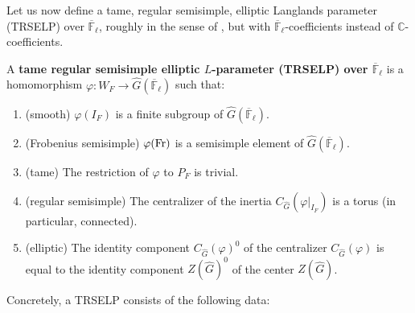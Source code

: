 	Let us now define a tame, regular semisimple, elliptic Langlands parameter (TRSELP) over $\overline{\mathbb{F}}_{\ell}$, roughly in the sense of \cite[Section 3.4, 4.1]{debacker2009depth}, but with $\overline{\mathbb{F}}_{\ell}$-coefficients instead of $\mathbb{C}$-coefficients.
	
	\begin{definition}\label{Def TRSELP}
		A \textbf{tame regular semisimple elliptic $L$-parameter (TRSELP) over $\overline{\mathbb{F}}_{\ell}$} is a homomorphism $\varphi: W_F \to \hat{G}(\overline{\mathbb{F}}_{\ell})$ such that:
		\begin{enumerate}
			\item (smooth) $\varphi(I_F)$ is a finite subgroup of $\hat{G}(\overline{\mathbb{F}}_{\ell})$.
			\item (Frobenius semisimple) $\varphi(\operatorname{Fr})$ is a semisimple element of $\hat{G}(\overline{\mathbb{F}}_{\ell})$.
			\item (tame) The restriction of $\varphi$ to $P_F$ is trivial.
			\item \label{regular semisimple}(regular semisimple) The centralizer of the inertia $C_{\hat{G}}(\varphi|_{I_F})$ is a torus (in particular, connected).
			\item \label{elliptic} (elliptic) The identity component $C_{\hat{G}}(\varphi)^0$ of the centralizer $C_{\hat{G}}(\varphi)$ is equal to the identity  component $Z(\hat{G})^0$ of the center $Z(\hat{G})$.
			\end{enumerate}
	\end{definition}

    Concretely, a TRSELP consists of the following data:
    
